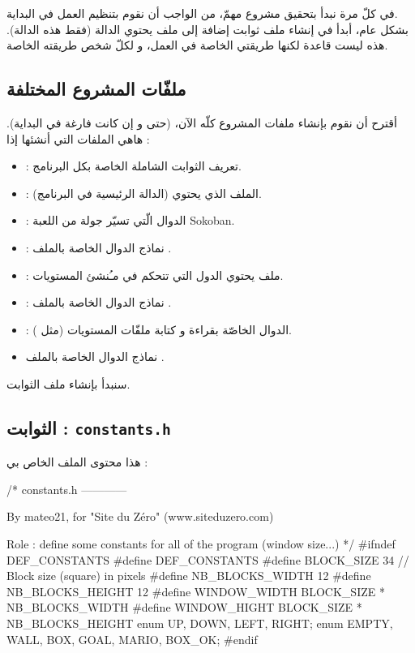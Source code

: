 في كلّ مرة نبدأ بتحقيق مشروع مهمّ، من الواجب أن نقوم بتنظيم العمل في البداية.\\
بشكل عام، أبدأ في إنشاء ملف ثوابت
إضافة إلى ملف
يحتوي الدالة
(فقط هذه الدالة). هذه ليست قاعدة لكنها طريقتي الخاصة في العمل، و لكلّ شخص طريقته الخاصة.

\subsection{ملفّات المشروع المختلفة}

أقترح أن نقوم بإنشاء ملفات المشروع كلّه الآن، (حتى و إن كانت فارغة في البداية). هاهي الملفات التي أنشئها إذا :
\begin{itemize}
	\item {} :
	تعريف الثوابت الشاملة الخاصة بكل البرنامج.
	\item {} :
	الملف الذي يحتوي
	(الدالة الرئيسية في البرنامج).
	\item {} :
	الدوال الّتي تسيّر جولة من اللعبة 
	\textenglish{Sokoban}.
	\item {} :
	نماذج الدوال الخاصة بالملف 
	.
	\item {} :
	ملف يحتوي الدول التي تتحكم في مـُنشئ المستويات.
	\item {} :
	نماذج الدوال الخاصة بالملف 
	.
	\item {} :
	الدوال الخاصّة بقراءة و كتابة ملفّات المستويات (مثل
	).
	\item نماذج الدوال الخاصة بالملف 
	.
\end{itemize}
سنبدأ بإنشاء ملف الثوابت.

\subsection{الثوابت : \texttt{constants.h}}

هذا محتوى الملف
الخاص بي :

\begin{Csource}
/*
constants.h
------------

By mateo21, for "Site du Zéro" (www.siteduzero.com)

Role : define some constants for all of the program (window size...)
*/
#ifndef DEF_CONSTANTS
#define DEF_CONSTANTS
#define BLOCK_SIZE 34 // Block size (square) in pixels
#define NB_BLOCKS_WIDTH 12
#define NB_BLOCKS_HEIGHT 12
#define WINDOW_WIDTH BLOCK_SIZE * NB_BLOCKS_WIDTH
#define WINDOW_HIGHT BLOCK_SIZE * NB_BLOCKS_HEIGHT
enum {UP, DOWN, LEFT, RIGHT};
enum {EMPTY, WALL, BOX, GOAL, MARIO, BOX_OK};
#endif
\end{Csource}

